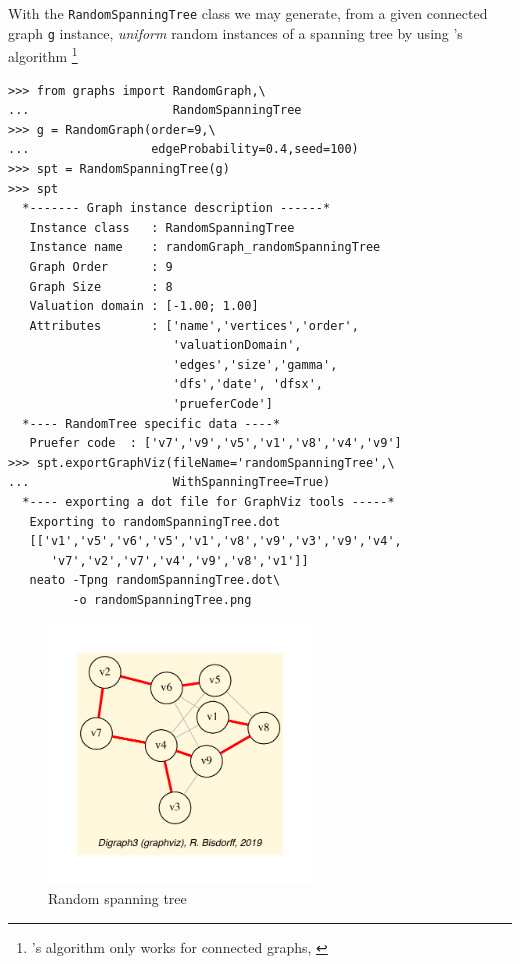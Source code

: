 With the \texttt{RandomSpanningTree} class we may generate, from a given connected graph \texttt{g} instance, \emph{uniform} random instances of a spanning tree by using \Wilson's algorithm \footnote{\Wilson's algorithm only works for connected graphs, \citep{WIL-1996}}
\begin{lstlisting}[caption={Generating uniform random spanning trees.},label=list:22.5]
>>> from graphs import RandomGraph,\
...                    RandomSpanningTree
>>> g = RandomGraph(order=9,\
...                 edgeProbability=0.4,seed=100)
>>> spt = RandomSpanningTree(g)
>>> spt
  *------- Graph instance description ------*
   Instance class   : RandomSpanningTree
   Instance name    : randomGraph_randomSpanningTree
   Graph Order      : 9
   Graph Size       : 8
   Valuation domain : [-1.00; 1.00]
   Attributes       : ['name','vertices','order',
                       'valuationDomain',
                       'edges','size','gamma',
                       'dfs','date', 'dfsx',
                       'prueferCode']
  *---- RandomTree specific data ----*
   Pruefer code  : ['v7','v9','v5','v1','v8','v4','v9']
>>> spt.exportGraphViz(fileName='randomSpanningTree',\
...                    WithSpanningTree=True)
  *---- exporting a dot file for GraphViz tools -----*
   Exporting to randomSpanningTree.dot
   [['v1','v5','v6','v5','v1','v8','v9','v3','v9','v4',
      'v7','v2','v7','v4','v9','v8','v1']]
   neato -Tpng randomSpanningTree.dot\
         -o randomSpanningTree.png
\end{lstlisting}
\begin{figure}[h]
\sidecaption[t]
\includegraphics[width=7cm]{Figures/randomSpanningTree.pdf}
\caption{Random spanning tree} 
\label{fig:22.5}       %
\end{figure}


